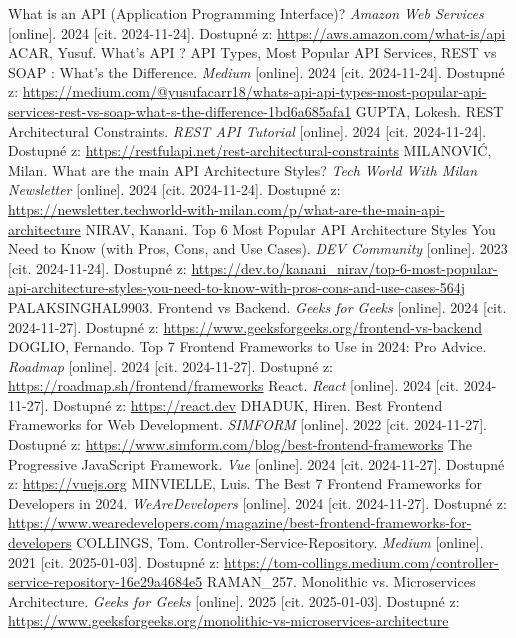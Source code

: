 \documentclass[twoside]{ctuthesis}
\begin{document}
\begin{thebibliography}{1}
What is an API (Application Programming Interface)? \emph{Amazon Web Services} [online]. 2024 [cit. 2024-11-24]. Dostupné z: \url{https://aws.amazon.com/what-is/api}
ACAR, Yusuf. What’s API ? API Types, Most Popular API Services, REST vs SOAP : What’s the Difference. \emph{Medium} [online]. 2024 [cit. 2024-11-24]. Dostupné z: \url{https://medium.com/@yusufacarr18/whats-api-api-types-most-popular-api-services-rest-vs-soap-what-s-the-difference-1bd6a685afa1}
GUPTA, Lokesh. REST Architectural Constraints. \emph{REST API Tutorial} [online]. 2024 [cit. 2024-11-24]. Dostupné z: \url{https://restfulapi.net/rest-architectural-constraints}
MILANOVIĆ, Milan. What are the main API Architecture Styles? \emph{Tech World With Milan Newsletter} [online]. 2024 [cit. 2024-11-24]. Dostupné z: \url{https://newsletter.techworld-with-milan.com/p/what-are-the-main-api-architecture}
NIRAV, Kanani. Top 6 Most Popular API Architecture Styles You Need to Know (with Pros, Cons, and Use Cases). \emph{DEV Community} [online]. 2023 [cit. 2024-11-24]. Dostupné z: \url{https://dev.to/kanani_nirav/top-6-most-popular-api-architecture-styles-you-need-to-know-with-pros-cons-and-use-cases-564j}
PALAKSINGHAL9903. Frontend vs Backend. \emph{Geeks for Geeks} [online]. 2024 [cit. 2024-11-27]. Dostupné z: \url{https://www.geeksforgeeks.org/frontend-vs-backend}
DOGLIO, Fernando. Top 7 Frontend Frameworks to Use in 2024: Pro Advice. \emph{Roadmap} [online]. 2024 [cit. 2024-11-27]. Dostupné z: \url{https://roadmap.sh/frontend/frameworks}
React. \emph{React} [online]. 2024 [cit. 2024-11-27]. Dostupné z: \url{https://react.dev}
DHADUK, Hiren. Best Frontend Frameworks for Web Development. \emph{SIMFORM} [online]. 2022 [cit. 2024-11-27]. Dostupné z: \url{https://www.simform.com/blog/best-frontend-frameworks}
The Progressive JavaScript Framework. \emph{Vue} [online]. 2024 [cit. 2024-11-27]. Dostupné z: \url{https://vuejs.org}
MINVIELLE, Luis. The Best 7 Frontend Frameworks for Developers in 2024. \emph{WeAreDevelopers} [online]. 2024 [cit. 2024-11-27]. Dostupné z: \url{https://www.wearedevelopers.com/magazine/best-frontend-frameworks-for-developers}
COLLINGS, Tom. Controller-Service-Repository. \emph{Medium} [online]. 2021 [cit. 2025-01-03]. Dostupné z: \url{https://tom-collings.medium.com/controller-service-repository-16e29a4684e5}
RAMAN\_257. Monolithic vs. Microservices Architecture. \emph{Geeks for Geeks} [online]. 2025 [cit. 2025-01-03]. Dostupné z: \url{https://www.geeksforgeeks.org/monolithic-vs-microservices-architecture}

\end{thebibliography}
\end{document}
